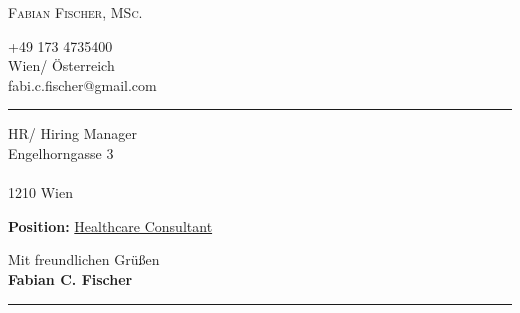 \documentclass[11pt, a4paper, roman]{letter}
\begin{document}
\pagestyle{empty}
\raggedbottom

\begin{minipage}[t]{0.5\textwidth}
    \vspace*{\fill}
    \textsc{{\Huge Fabian Fischer}, {\LARGE MSc.}} %
    \vspace*{\fill}
\end{minipage}\hfill
\begin{minipage}[t]{0.3\textwidth}
    \setlength{\baselineskip}{15pt}
    \RaggedLeft 
    \faMobile{} +49 173 4735400\\
    \faHome{} Wien/ Österreich\\ 
    \faEnvelope {} fabi.c.fischer@gmail.com\\ 
\end{minipage}

{\color{cvteal} \rule{\linewidth}{1mm}}

\begin{minipage}[t]{\textwidth}

    \begin{letter} {HR/ Hiring Manager\\Engelhorngasse 3\\
\\1210 Wien} %


    \begin{center} {\textbf{Position:} \underline{Healthcare Consultant}} \end{center}

\setlength{\parskip}{20pt}




\end{letter}
\end{minipage}

\vspace*{\fill}




{
\setlength{\parskip}{10pt}
\setlength{\parindent}{10pt}
\setlength{\baselineskip}{15pt}


}

Mit freundlichen Grüßen\\\textbf{Fabian C. Fischer}

\vspace*{\fill}

{\color{cvteal} \rule{\linewidth}{1mm}}
\end{document}
